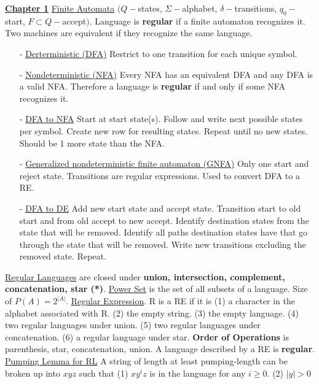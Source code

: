 \documentclass[9pt]{article}
\begin{document}
\noindent\uline{\textbf{Chapter 1}}\newline
\uline{Finite Automata} $(Q - $states, $\Sigma - $alphabet, $ \delta - $transitions,
$q_0 - $start, $F\subset Q - $accept$)$. Language is \textbf{regular} if a finite 
automaton recognizes it. Two machines are equivalent if they recognize the same
language.
\begin{itemize}[noitemsep, topsep=0pt]
    \item[-]\uline{Derterministic (DFA)} Restrict to one transition for each unique 
    symbol.
    \item[-]\uline{Nondeterministic (NFA)} Every NFA has an equivalent DFA and any 
    DFA is a valid NFA. Therefore a language is \textbf{regular} if and only if some 
    NFA recognizes it. 
    \item[-]\uline{DFA to NFA} Start at start state(s). Follow and write next possible 
    states per symbol. Create new row for resulting states. Repeat until no new states.
    Should be 1 more state than the NFA.
    \item[-]\uline{Generalized nondeterministic finite automaton (GNFA)} Only one start
    and reject state. Transitions are regular expressions. Used to convert DFA to a RE.
    \item[-]\uline{DFA to DE} Add new start state and accept state. Transition start 
    to old start and from old accept to new accept. Identify destination states from 
    the state that will be removed. Identify all paths destination states have that go
    through the state that will be removed. Write new transitions excluding the removed
    state. Repeat.
\end{itemize}
\uline{Regular Languages} are closed under \textbf{union, intersection, complement, 
concatenation, star (*)}.\newline
\uline{Power Set} is the set of all subsets of a language. Size of $P(A) = 2^{|A|}$. 
\newline
\uline{Regular Expression}. R is a RE if it is (1) a character in the alphabet 
associated with R. (2) the empty string. (3) the empty language. (4) two regular 
languages under union. (5) two regular languages under concatenation. (6) a regular 
language under star. \textbf{Order of Operations} is parenthesis, star, concatenation,
union. A language described by a RE is \textbf{regular}.\newline
\uline{Pumping Lemma for RL} A string of length at least pumping-length can be broken
up into $xyz$ such that (1) $xy^iz$ is in the language for any $i\geq 0$. (2) $|y|>0$
\end{document}
